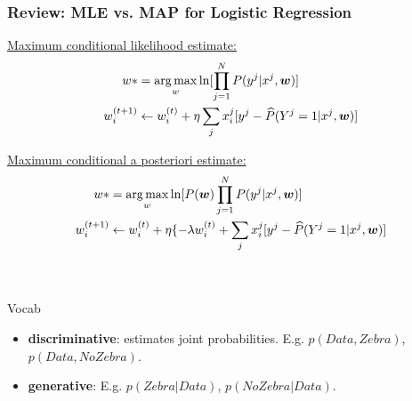 \subsubsection{Review: MLE vs. MAP for Logistic Regression}
\underline{Maximum conditional likelihood estimate:}
\begin{align*}
	w* &= \operatorname*{arg\,max}_w \ln[\prod_{j=1}^N P(y^j | x^j, \bm{w})] \\
	w_i^{(t+1)} & \leftarrow w_i^{(t)} + \eta \sum_j x_i^j [y^j - \widehat{P}(Y^j = 1 | x^j, \bm{w})]\\
\end{align*}

\underline{Maximum conditional a posteriori estimate:}
\begin{align*}
	w* &= \operatorname*{arg\,max}_w \ln[P(\bm{w}) \prod_{j=1}^N P(y^j | x^j, \bm{w})] \\
	w_i^{(t+1)} & \leftarrow w_i^{(t)} + \eta \{ -\lambda w_i^{(t)} +  \sum_j x_i^j [y^j - \widehat{P}(Y^j = 1 | x^j, \bm{w})]\\
\end{align*}

\hfill \\  \hfill \\


Vocab \hfill \\
\begin{itemize}
	\item \textbf{discriminative}:  estimates joint probabilities.  E.g. $p(Data, Zebra)$, $p(Data, No Zebra)$. 
	\item \textbf{generative}:  E.g. $p(Zebra | Data)$, $p(No Zebra | Data)$. 
\end{itemize}

